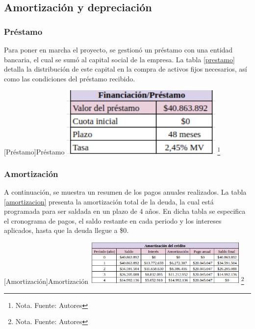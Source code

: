 \subsection{Amortización y depreciación}

\subsubsection{Préstamo}

Para poner en marcha el proyecto, se gestionó un préstamo con una entidad bancaria, el cual se sumó al capital social de la empresa. La tabla \ref{prestamo} detalla la distribución de este capital en la compra de activos fijos necesarios, así como las condiciones del préstamo recibido.

\vspace{2mm}
\begin{minipage}{0.9\textwidth}
\centering
{}[Préstamo]{Préstamo}
\label{prestamo}
\includegraphics[width=0.6\textwidth]{Content/Images/AF/amortizacion_financiacion.png}
\footnote{Nota. \textup{Fuente: Autores}}
\end{minipage}

\subsubsection{Amortización}

A continuación, se muestra un resumen de los pagos anuales realizados. La tabla \ref{amortizacion} presenta la amortización total de la deuda, la cual está programada para ser saldada en un plazo de 4 años. En dicha tabla se especifica el cronograma de pagos, el saldo restante en cada periodo y los intereses aplicados, hasta que la deuda llegue a \$0.

\vspace{2mm}
\begin{minipage}{0.9\textwidth}
\centering
{}[Amortización]{Amortización}
\label{amortizacion}
\includegraphics[width=0.6\textwidth]{Content/Images/AF/amortizacion_amortizacion.png}
\footnote{Nota. \textup{Fuente: Autores}}
\end{minipage}

